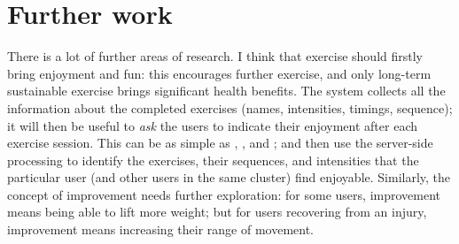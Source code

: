 \section{Further work}
There is a lot of further areas of research. I think that exercise should firstly bring enjoyment and fun: this encourages further exercise, and only long-term sustainable exercise brings significant health benefits. The system collects all the information about the completed exercises (names, intensities, timings, sequence); it will then be useful to \emph{ask} the users to indicate their enjoyment after each exercise session. This can be as simple as \smiley{}, \neutranie{}, and \frownie{}; and then use the server-side processing to identify the exercises, their sequences, and intensities that the particular user (and other users in the same cluster) find enjoyable. Similarly, the concept of improvement needs further exploration: for some users, improvement means being able to lift more weight; but for users recovering from an injury, improvement means increasing their range of movement.

\printbibliography

 
